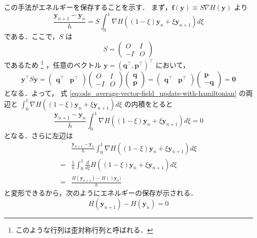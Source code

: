 この手法がエネルギーを保存することを示す．
まず，$\bm{f}(\bm{y}) \equiv S \nabla H(\bm{y})$ より
\begin{equation}
    \frac{\bm{y}_{n+1} - \bm{y}_n}{h}
    = S \int_{0}^{1} \nabla H((1 - \xi) \bm{y}_n + \xi \bm{y}_{n+1}) d \xi
    \label{eq:ode_average-vector-field_update-with-hamiltonian}
\end{equation}
である．ここで，$S$ は
\begin{equation}
    S =
    \begin{pmatrix}
        O  & I \\
        -I & O
    \end{pmatrix}
\end{equation}
であるため
\footnote{このような行列は歪対称行列と呼ばれる．}
，任意のベクトル $\bm{y} = (\bm{q}^\top, \bm{p}^\top)^\top$ において，
\begin{equation}
    \bm{y}^\top S \bm{y} =
    \begin{pmatrix}
        \bm{q}^\top & \bm{p}^\top
    \end{pmatrix}
    \begin{pmatrix}
        O  & I \\
        -I & O
    \end{pmatrix}
    \begin{pmatrix}
        \bm{q} \\ \bm{p}
    \end{pmatrix}
    =
    \begin{pmatrix}
        \bm{q}^\top & \bm{p}^\top
    \end{pmatrix}
    \begin{pmatrix}
        \bm{p} \\ -\bm{q}
    \end{pmatrix}
    = \bm{0}
\end{equation}
となる．よって，
式 \eqref{eq:ode_average-vector-field_update-with-hamiltonian}
の両辺と
$\int_{0}^{1} \nabla H((1 - \xi) \bm{y}_n + \xi \bm{y}_{n+1}) d \xi$ の内積をとると
\begin{equation}
    \frac{\bm{y}_{n+1} - \bm{y}_n}{h}
    \int_{0}^{1} \nabla H((1 - \xi) \bm{y}_n + \xi \bm{y}_{n+1}) d \xi
    = 0
\end{equation}
となる．さらに左辺は
\begin{align}
      & \frac{\bm{y}_{n+1} - \bm{y}_n}{h}
    \int_{0}^{1} \nabla H((1 - \xi) \bm{y}_n + \xi \bm{y}_{n+1}) d \xi         \\
    = & \frac{1}{h}
    \int_{0}^{1} \frac{d}{d\xi} H((1 - \xi) \bm{y}_n + \xi \bm{y}_{n+1}) d \xi \\
    = & \frac{H(\bm{y}_{n+1}) - H()\bm{y}_{n})}{h}
\end{align}
と変形できるから，次のようにエネルギーの保存が示される．
\begin{equation}
    H(\bm{y}_{n+1}) - H(\bm{y}_{n}) = 0
\end{equation}

